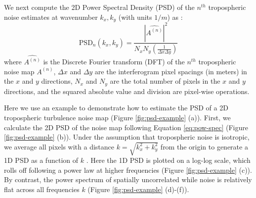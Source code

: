 \documentclass{utexasthesis}
\begin{document}
We next compute the 2D Power Spectral Density (PSD) of the $n^{th}$ tropospheric noise estimates at  wavenumber $ k_x, k_y $ (with units $1/m$) as \cite{Jacobs2017QuantitativeCharacterizationSurface}:
\begin{equation}
\text{PSD}_n(k_x, k_y) = \frac{| \widehat{A^{(n)}} |^2 }{N_x N_y (\frac{1}{\Delta x \Delta y}) } \label{eq:pow-spec}
\end{equation}
where  $\widehat{A^{(n)}}$ is the Discrete Fourier transform (DFT) of  the $n^{th}$ tropospheric noise map $A^{(n)}$, $\Delta x$ and $\Delta y$ are the interferogram pixel spacings (in meters) in the $x$ and $y$ directions, $N_x$ and $N_y$ are the total number of pixels in the $x$ and $y$ directions, and the squared absolute value and division are pixel-wise operations. 



Here we use an example to demonstrate how to estimate the PSD of a 2D tropospheric turbulence noise map (Figure \ref{fig:psd-example} (a)). First, we calculate the 2D PSD of the noise map following Equation \eqref{eq:pow-spec} (Figure \ref{fig:psd-example} (b)). Under the assumption that tropospheric noise is isotropic, we average all pixels with a distance  $k= \sqrt{k_x^2 + k_y^2}$ from the origin to generate a 1D PSD as a function of $k$ \cite{Hanssen2001RadarInterferometryData}.
Here the 1D PSD is plotted on a log-log scale, which rolls off following a power law at higher frequencies (Figure \ref{fig:psd-example} (c)). By contrast, the power spectrum of spatially uncorrelated while noise is relatively flat across all frequencies $k$ (Figure \ref{fig:psd-example} (d)-(f)).
\end{document}
